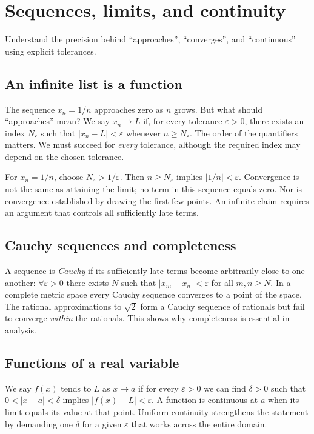 \chapter{Sequences, limits, and continuity}\label{ch:limits}
\begin{readergoal}Understand the precision behind ``approaches'', ``converges'', and ``continuous'' using explicit tolerances.\end{readergoal}
\section{An infinite list is a function}
The sequence $x_n=1/n$ approaches zero as $n$ grows. But what should ``approaches'' mean? We say $x_n\to L$ if, for every tolerance $\varepsilon>0$, there exists an index $N_\varepsilon$ such that $|x_n-L|<\varepsilon$ whenever $n\ge N_\varepsilon$. The order of the quantifiers matters. We must succeed for \emph{every} tolerance, although the required index may depend on the chosen tolerance.

For $x_n=1/n$, choose $N_\varepsilon>1/\varepsilon$. Then $n\ge N_\varepsilon$ implies $|1/n|<\varepsilon$. Convergence is not the same as attaining the limit; no term in this sequence equals zero. Nor is convergence established by drawing the first few points. An infinite claim requires an argument that controls all sufficiently late terms.

\section{Cauchy sequences and completeness}
A sequence is \emph{Cauchy} if its sufficiently late terms become arbitrarily close to one another: $\forall\varepsilon>0$ there exists $N$ such that $|x_m-x_n|<\varepsilon$ for all $m,n\ge N$. In a complete metric space every Cauchy sequence converges to a point of the space. The rational approximations to $\sqrt2$ form a Cauchy sequence of rationals but fail to converge \emph{within} the rationals. This shows why completeness is essential in analysis.

\section{Functions of a real variable}
We say $f(x)$ tends to $L$ as $x\to a$ if for every $\varepsilon>0$ we can find $\delta>0$ such that $0<|x-a|<\delta$ implies $|f(x)-L|<\varepsilon$. A function is continuous at $a$ when its limit equals its value at that point. Uniform continuity strengthens the statement by demanding one $\delta$ for a given $\varepsilon$ that works across the entire domain.

